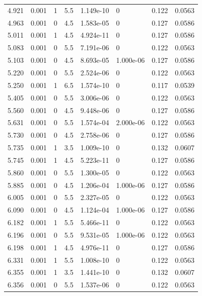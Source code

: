 \documentclass[preview]{standalone}
\begin{document}
{{{\begin{tabular}{L{1.2cm}C{1.2cm} C{0.3cm}C{0.5cm} C{1.4cm}C{1.4cm} C{1.4cm}C{1.4cm}}
  4.921  &  0.001  & 1     & 5.5 &  1.149e-10  & 0  & 0.122 &  0.0563   \\ 
  4.963  &  0.001  & 0     & 4.5 &  1.583e-05  & 0  & 0.127 &  0.0586   \\ 
  5.011  &  0.001  & 1     & 4.5 &  4.924e-11  & 0  & 0.127 &  0.0586   \\ 
  5.083  &  0.001  & 0     & 5.5 &  7.191e-06  & 0  & 0.122 &  0.0563   \\ 
  5.103  &  0.001  & 0     & 4.5 &  8.693e-05  & 1.000e-06  & 0.127 &  0.0586   \\ 
  5.220  &  0.001  & 0     & 5.5 &  2.524e-06  & 0  & 0.122 &  0.0563   \\ 
  5.250  &  0.001  & 1     & 6.5 &  1.574e-10  & 0  & 0.117 &  0.0539   \\ 
  5.405  &  0.001  & 0     & 5.5 &  3.006e-06  & 0  & 0.122 &  0.0563   \\ 
  5.560  &  0.001  & 0     & 4.5 &  9.448e-06  & 0  & 0.127 &  0.0586   \\ 
  5.631  &  0.001  & 0     & 5.5 &  1.574e-04  & 2.000e-06  & 0.122 &  0.0563   \\ 
  5.730  &  0.001  & 0     & 4.5 &  2.758e-06  & 0  & 0.127 &  0.0586   \\ 
  5.735  &  0.001  & 1     & 3.5 &  1.009e-10  & 0  & 0.132 &  0.0607   \\ 
  5.745  &  0.001  & 1     & 4.5 &  5.223e-11  & 0  & 0.127 &  0.0586   \\ 
  5.860  &  0.001  & 0     & 5.5 &  1.300e-05  & 0  & 0.122 &  0.0563   \\ 
  5.885  &  0.001  & 0     & 4.5 &  1.206e-04  & 1.000e-06  & 0.127 &  0.0586   \\ 
  6.005  &  0.001  & 0     & 5.5 &  2.327e-05  & 0  & 0.122 &  0.0563   \\ 
  6.090  &  0.001  & 0     & 4.5 &  1.124e-04  & 1.000e-06  & 0.127 &  0.0586   \\ 
  6.182  &  0.001  & 1     & 5.5 &  5.466e-11  & 0  & 0.122 &  0.0563   \\ 
  6.196  &  0.001  & 0     & 5.5 &  9.531e-05  & 1.000e-06  & 0.122 &  0.0563   \\ 
  6.198  &  0.001  & 1     & 4.5 &  4.976e-11  & 0  & 0.127 &  0.0586   \\ 
  6.331  &  0.001  & 1     & 5.5 &  1.008e-10  & 0  & 0.122 &  0.0563   \\ 
  6.355  &  0.001  & 1     & 3.5 &  1.441e-10  & 0  & 0.132 &  0.0607   \\ 
  6.356  &  0.001  & 0     & 5.5 &  1.537e-06  & 0  & 0.122 &  0.0563   \\ 

\end{tabular}}}}
\end{document}
